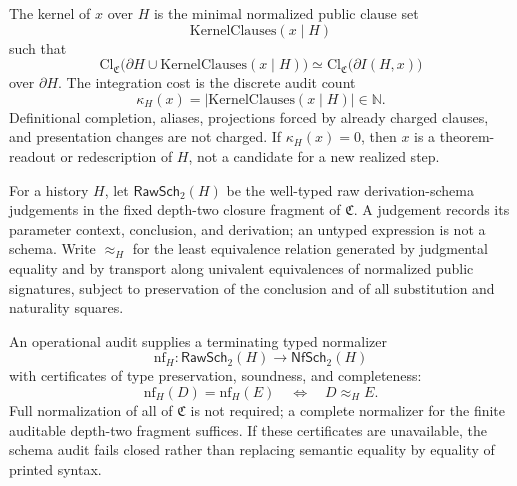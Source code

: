 \begin{definition}
The kernel of \(x\) over \(H\) is the minimal normalized public clause set
\[
\mathrm{KernelClauses}(x\mid H)
\]
such that
\[
\mathrm{Cl}_{\mathfrak{C}}\bigl(\partial H\cup
\mathrm{KernelClauses}(x\mid H)\bigr)
\simeq
\mathrm{Cl}_{\mathfrak{C}}\bigl(\partial I(H,x)\bigr)
\]
over \(\partial H\). The integration cost is the discrete audit count
\[
\kappa_H(x)
=
\bigl|\mathrm{KernelClauses}(x\mid H)\bigr|
\in \mathbb{N}.
\]
Definitional completion, aliases, projections forced by already charged
clauses, and presentation changes are not charged. If \(\kappa_H(x)=0\), then
\(x\) is a theorem-readout or redescription of \(H\), not a candidate for a new
realized step.
\end{definition}

\begin{definition}
\label{def:typed-operational-schema-audit}
For a history \(H\), let \(\mathsf{RawSch}_2(H)\) be the well-typed raw
derivation-schema judgements in the fixed depth-two closure fragment of
\(\mathfrak C\). A judgement records its parameter context, conclusion, and
derivation; an untyped expression is not a schema. Write \(\approx_H\) for the
least equivalence relation generated by judgmental equality and by transport
along univalent equivalences of normalized public signatures, subject to
preservation of the conclusion and of all substitution and naturality squares.

An operational audit supplies a terminating typed normalizer
\[
  \mathrm{nf}_H:\mathsf{RawSch}_2(H)\longrightarrow
  \mathsf{NfSch}_2(H)
\]
with certificates of type preservation, soundness, and completeness:
\[
  \mathrm{nf}_H(D)=\mathrm{nf}_H(E)
  \quad\Longleftrightarrow\quad
  D\approx_H E.
\]
Full normalization of all of \(\mathfrak C\) is not required; a complete
normalizer for the finite auditable depth-two fragment suffices. If these
certificates are unavailable, the schema audit fails closed rather than
replacing semantic equality by equality of printed syntax.
\end{definition}

